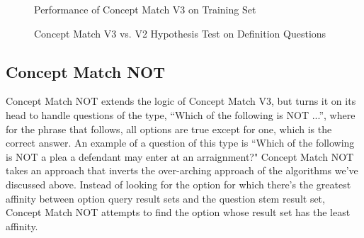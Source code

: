 \begin{figure}
\centering
\vspace{0.75in}
\caption{Performance of Concept Match V3 on Training Set}
\label{fig:concept_match_v3_training_set_performance}
\end{figure}



\begin{figure}
\centering
\vspace{0.75in}
\caption{Concept Match V3 vs. V2 Hypothesis Test on Definition Questions}
\label{fig:concept_match_v3_hypothesis_test}
\end{figure}



\subsection{Concept Match NOT}

Concept Match NOT extends the logic of Concept Match V3, but turns it on its head to handle questions of the type, ``Which of the following is NOT ...'', where for the phrase that follows, all options are true except for one, which is the correct answer.  An example of a question of this type is ``Which of the following is NOT a plea a defendant may enter at an arraignment?" \cite{acfe_study_package_2011}
Concept Match NOT takes an approach that inverts the over-arching approach of the algorithms we've discussed above.  Instead of looking for the option for which there's the greatest affinity between option query result sets and the question stem result set, Concept Match NOT attempts to find the option whose result set has the least affinity.  


